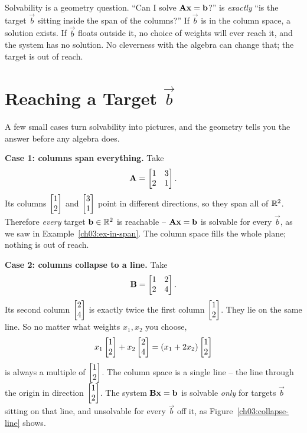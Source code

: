 \begin{focusbox}
Solvability is a geometry question. ``Can I solve $\mathbf{A}\mathbf{x}=\mathbf{b}$?'' is \emph{exactly} ``is the target $\vec{b}$ sitting inside the span of the columns?'' If $\vec{b}$ is in the column space, a solution exists. If $\vec{b}$ floats outside it, no choice of weights will ever reach it, and the system has no solution. No cleverness with the algebra can change that; the target is out of reach.
\end{focusbox}

\section{Reaching a Target $\vec{b}$}

A few small cases turn solvability into pictures, and the geometry tells you the answer before any algebra does.

\textbf{Case 1: columns span everything.} Take
\[
  \mathbf{A} = \begin{bmatrix} 1 & 3 \\ 2 & 1 \end{bmatrix}.
\]
Its columns $\begin{bmatrix}1\\2\end{bmatrix}$ and $\begin{bmatrix}3\\1\end{bmatrix}$ point in different directions, so they span all of $\mathbb{R}^2$. Therefore \emph{every} target $\mathbf{b}\in\mathbb{R}^2$ is reachable -- $\mathbf{A}\mathbf{x}=\mathbf{b}$ is solvable for every $\vec{b}$, as we saw in Example~\ref{ch03:ex-in-span}. The column space fills the whole plane; nothing is out of reach.

\textbf{Case 2: columns collapse to a line.} Take
\[
  \mathbf{B} = \begin{bmatrix} 1 & 2 \\ 2 & 4 \end{bmatrix}.
\]
Its second column $\begin{bmatrix}2\\4\end{bmatrix}$ is exactly twice the first column $\begin{bmatrix}1\\2\end{bmatrix}$. They lie on the same line. So no matter what weights $x_1, x_2$ you choose,
\[
  x_1\begin{bmatrix}1\\2\end{bmatrix} + x_2\begin{bmatrix}2\\4\end{bmatrix} = (x_1 + 2x_2)\begin{bmatrix}1\\2\end{bmatrix}
\]
is always a multiple of $\begin{bmatrix}1\\2\end{bmatrix}$. The column space is a single line -- the line through the origin in direction $\begin{bmatrix}1\\2\end{bmatrix}$. The system $\mathbf{B}\mathbf{x}=\mathbf{b}$ is solvable \emph{only} for targets $\vec{b}$ sitting on that line, and unsolvable for every $\vec{b}$ off it, as Figure~\ref{ch03:collapse-line} shows.

